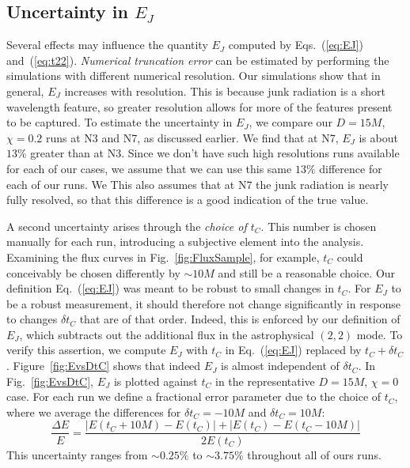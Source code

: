 \subsection{Uncertainty in $E_J$}
\label{subsec:ErrorEstimation}


Several effects may influence the quantity $E_J$ computed by
  Eqs.~(\ref{eq:EJ}) and~(\ref{eq:t22}).  {\em Numerical truncation
    error} can be estimated by performing the simulations with
  different numerical resolution.  Our simulations show that in general,
  $E_J$ increases with resolution. This is because junk radiation is
a short wavelength feature, so greater resolution allows for more of
the features present to be captured.  To estimate the
uncertainty in $E_J$, we compare our $D=15M$,
$\chi=0.2$ runs at N3 and N7, as discussed earlier. We find that
at N7, $E_J$ is about $13\%$ greater than at N3. Since we don't
have such high resolutions runs available for each of our cases, we
assume that we can use this same $13\%$ difference for each of our
runs. We This also assumes that at N7 the junk
radiation is nearly fully resolved, so that this difference is a good
indication of the true value.   


A second uncertainty arises through the {\em choice of $t_C$}.
This number is chosen manually for
each run, introducing a
  subjective element into the analysis. Examining the flux curves in
Fig.~\ref{fig:FluxSample}, for example, $t_C$ could conceivably be
chosen differently by $\sim 10 M$ and still be a
reasonable choice. {Our definition Eq.~(\ref{eq:EJ}) was meant
to be robust to small changes in $t_C$.  For $E_J$ to be a robust measurement, it should
therefore not change significantly in response to changes $\delta t_C$
that are of that order. Indeed, this is enforced by our definition of
$E_J$, which subtracts out the additional flux in the astrophysical
$(2,2)$ mode.}  To verify this assertion, we compute $E_J$ with $t_C$ in Eq.~(\ref{eq:EJ}) replaced by $t_C+\delta t_C$.  Figure~\ref{fig:EvsDtC} shows that indeed $E_J$ is almost independent of $\delta t_C$.  
In Fig.~\ref{fig:EvsDtC}, $E_J$ is plotted against $t_C$
in the representative $D=15M$, $\chi=0$ case.
For each run we define a fractional
error parameter due to the choice of $t_C$, where we average the
differences for $\delta t_C = -10M$ and $\delta t_C = 10M$:
\begin{equation}
\frac{\Delta E}{E} = \frac{|E(t_C+10M) - E(t_C)| + |E(t_C) - E(t_C -
  10M)|}{2E(t_C)}
\end{equation}
This uncertainty ranges from $\sim 0.25\%$ to $\sim 3.75\%$ throughout
all of ours runs.

